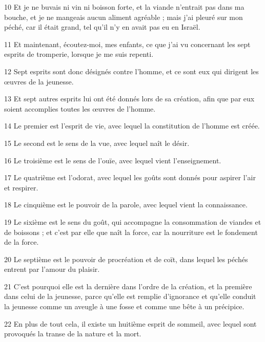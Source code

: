 \par 10 Et je ne buvais ni vin ni boisson forte, et la viande n'entrait pas dans ma bouche, et je ne mangeais aucun aliment agréable ; mais j'ai pleuré sur mon péché, car il était grand, tel qu'il n'y en avait pas eu en Israël.

\par 11 Et maintenant, écoutez-moi, mes enfants, ce que j'ai vu concernant les sept esprits de tromperie, lorsque je me suis repenti.

\par 12 Sept esprits sont donc désignés contre l'homme, et ce sont eux qui dirigent les œuvres de la jeunesse.

\par 13 Et sept autres esprits lui ont été donnés lors de sa création, afin que par eux soient accomplies toutes les œuvres de l'homme.

\par 14 Le premier est l'esprit de vie, avec lequel la constitution de l'homme est créée.

\par 15 Le second est le sens de la vue, avec lequel naît le désir.

\par 16 Le troisième est le sens de l'ouïe, avec lequel vient l'enseignement.

\par 17 Le quatrième est l'odorat, avec lequel les goûts sont donnés pour aspirer l'air et respirer.

\par 18 Le cinquième est le pouvoir de la parole, avec lequel vient la connaissance.

\par 19 Le sixième est le sens du goût, qui accompagne la consommation de viandes et de boissons ; et c'est par elle que naît la force, car la nourriture est le fondement de la force.

\par 20 Le septième est le pouvoir de procréation et de coït, dans lequel les péchés entrent par l'amour du plaisir.

\par 21 C'est pourquoi elle est la dernière dans l'ordre de la création, et la première dans celui de la jeunesse, parce qu'elle est remplie d'ignorance et qu'elle conduit la jeunesse comme un aveugle à une fosse et comme une bête à un précipice.

\par 22 En plus de tout cela, il existe un huitième esprit de sommeil, avec lequel sont provoqués la transe de la nature et la mort.

